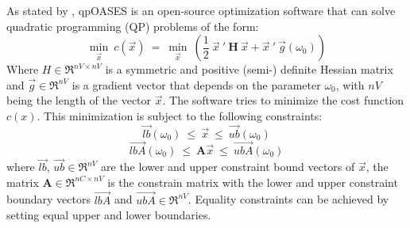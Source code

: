  As stated by \citet{qpoases},  qpOASES is an open-source optimization software that can solve quadratic programming (QP) problems of the form:
\begin{equation}
\underset{\vec{x}}{\min}\ c(\vec{x})\ =\  \underset{\vec{x}}{\min}\ \left( \frac{1}{2} \ \vec{x}\ ' \ \textbf{H} \ \vec{x} + \vec{x}\ ' \ \vec{g}(\omega_{0}) \right)
\label{eq:cost_in}
\end{equation}
Where $H \in \Re^{nV\times nV}$ is a symmetric and positive (semi-) definite Hessian matrix and $\vec{g} \in \Re^{nV}$ is a gradient vector that depends on the parameter $\omega_{0}$, with $nV$ being the length of the vector $\vec{x}$. The software tries to minimize the cost function $c(x)$. This minimization is subject to the following constraints:
$$\vec{lb}(\omega_{0})\ \leq\ \vec{x}\ \leq\ \vec{ub}(\omega_{0})$$
$$\vec{lbA}(\omega_{0})\ \leq\ \textbf{A}\vec{x}\ \leq\ \vec{ubA}(\omega_{0})$$
where $\vec{lb}$, $\vec{ub} \in \Re^{nV}$ are the lower and upper constraint bound vectors of $\vec{x}$, the matrix $\textbf{A} \in \Re^{nC\times nV}$ is the constrain matrix with the lower and upper constraint boundary vectors $\vec{lbA}$ and $\vec{ubA} \in \Re^{nV}$. Equality constraints can be achieved by setting equal upper and lower boundaries.
 
